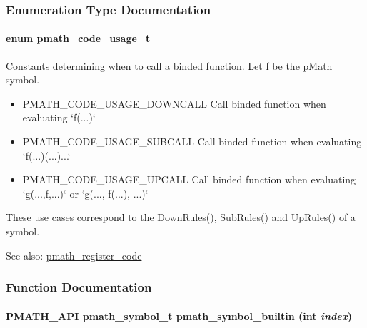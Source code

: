 \subsubsection{Enumeration Type Documentation}
\hypertarget{group__symbols_g957dfb51b09e821a8fc052835ea66670}{
\paragraph[{pmath\_\-code\_\-usage\_\-t}]{\setlength{\rightskip}{0pt plus 5cm}enum {\bf pmath\_\-code\_\-usage\_\-t}}\hfill}
\label{group__symbols_g957dfb51b09e821a8fc052835ea66670}


Constants determining when to call a binded function. Let f be the pMath symbol. 

\begin{itemize}
\item PMATH\_\-CODE\_\-USAGE\_\-DOWNCALL Call binded function when evaluating `f(...)`\end{itemize}


\begin{itemize}
\item PMATH\_\-CODE\_\-USAGE\_\-SUBCALL Call binded function when evaluating `f(...)(...)...`\end{itemize}


\begin{itemize}
\item PMATH\_\-CODE\_\-USAGE\_\-UPCALL Call binded function when evaluating `g(...,f,...)` or `g(..., f(...), ...)`\end{itemize}


These use cases correspond to the DownRules(), SubRules() and UpRules() of a symbol.

\begin{Desc}
\item[See also:]\hyperlink{group__symbols_gd02a05fa96992d137b450627486ec0b5}{pmath\_\-register\_\-code} \end{Desc}


\subsubsection{Function Documentation}
\hypertarget{group__symbols_ge9a166b048d04e6ef25632127f0172ba}{
\paragraph[{pmath\_\-symbol\_\-builtin}]{\setlength{\rightskip}{0pt plus 5cm}PMATH\_\-API {\bf pmath\_\-symbol\_\-t} pmath\_\-symbol\_\-builtin (int {\em index})}\hfill}
\label{group__symbols_ge9a166b048d04e6ef25632127f0172ba}


